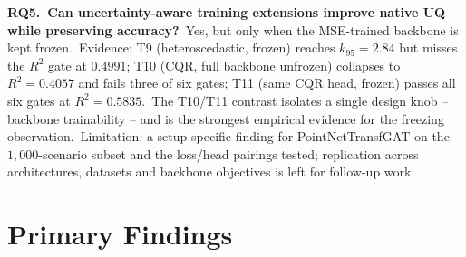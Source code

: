 \textbf{RQ5.\ Can uncertainty-aware training extensions improve native UQ while preserving accuracy?}\ Yes, but only when the MSE-trained backbone is kept frozen.\ Evidence: T9 (heteroscedastic, frozen) reaches $k_{95} = 2.84$ but misses the $R^2$ gate at $0.4991$; T10 (CQR, full backbone unfrozen) collapses to $R^2 = 0.4057$ and fails three of six gates; T11 (same CQR head, frozen) passes all six gates at $R^2 = 0.5835$.\ The T10/T11 contrast isolates a single design knob -- backbone trainability -- and is the strongest empirical evidence for the freezing observation.\ Limitation: a setup-specific finding for PointNetTransfGAT on the $1{,}000$-scenario subset and the loss/head pairings tested; replication across architectures, datasets and backbone objectives is left for follow-up work.

\section{Primary Findings}\label{sec:primary_results}


